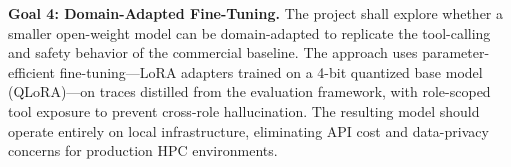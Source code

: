 \textbf{Goal 4: Domain-Adapted Fine-Tuning.} The project shall explore whether a smaller open-weight model can be domain-adapted to replicate the tool-calling and safety behavior of the commercial baseline. The approach uses parameter-efficient fine-tuning---LoRA adapters trained on a 4-bit quantized base model (QLoRA)---on traces distilled from the evaluation framework, with role-scoped tool exposure to prevent cross-role hallucination. The resulting model should operate entirely on local infrastructure, eliminating API cost and data-privacy concerns for production HPC environments.


